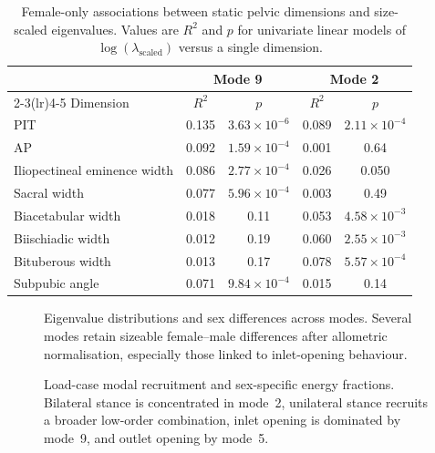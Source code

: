 \documentclass[11pt,a4paper]{article}
\begin{document}
\begin{table}[p]
\centering
\caption{Female-only associations between static pelvic dimensions and size-scaled eigenvalues. Values are $R^2$ and $p$ for univariate linear models of $\log(\lambda_{\mathrm{scaled}})$ versus a single dimension.}
\label{tab:staticassoc}
\begin{tabular}{lcccc}
\toprule
& \multicolumn{2}{c}{Mode 9} & \multicolumn{2}{c}{Mode 2} \\
\cmidrule(lr){2-3}\cmidrule(lr){4-5}
Dimension & $R^2$ & $p$ & $R^2$ & $p$ \\
\midrule
PIT & 0.135 & $3.63 \times 10^{-6}$ & 0.089 & $2.11 \times 10^{-4}$ \\
AP & 0.092 & $1.59 \times 10^{-4}$ & 0.001 & 0.64 \\
Iliopectineal eminence width & 0.086 & $2.77 \times 10^{-4}$ & 0.026 & 0.050 \\
Sacral width & 0.077 & $5.96 \times 10^{-4}$ & 0.003 & 0.49 \\
Biacetabular width & 0.018 & 0.11 & 0.053 & $4.58 \times 10^{-3}$ \\
Biischiadic width & 0.012 & 0.19 & 0.060 & $2.55 \times 10^{-3}$ \\
Bituberous width & 0.013 & 0.17 & 0.078 & $5.57 \times 10^{-4}$ \\
Subpubic angle & 0.071 & $9.84 \times 10^{-4}$ & 0.015 & 0.14 \\
\bottomrule
\end{tabular}
\end{table}

\clearpage

\begin{figure}[p]
\centering
{}
\caption{Eigenvalue distributions and sex differences across modes. Several modes retain sizeable female--male differences after allometric normalisation, especially those linked to inlet-opening behaviour.}
\label{fig:eigs}
\end{figure}

\begin{figure}[p]
\centering
{}
\caption{Load-case modal recruitment and sex-specific energy fractions. Bilateral stance is concentrated in mode~2, unilateral stance recruits a broader low-order combination, inlet opening is dominated by mode~9, and outlet opening by mode~5.}
\label{fig:recruitment}
\end{figure}
\end{document}
